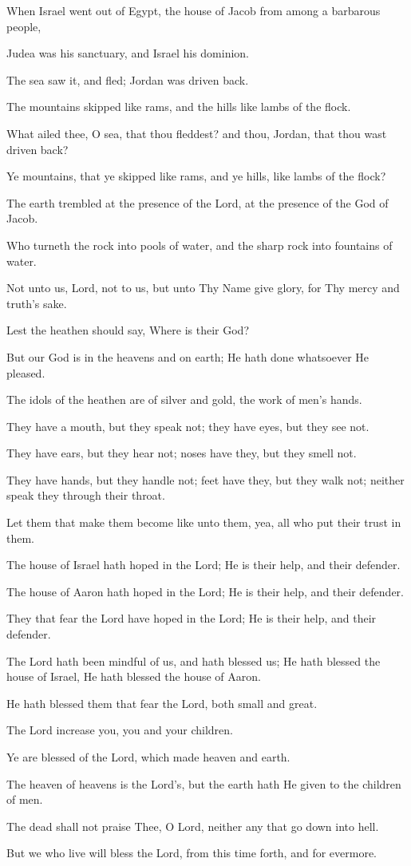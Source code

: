 When Israel went out of Egypt, the house of Jacob from among a barbarous people,

Judea was his sanctuary, and Israel his dominion.

The sea saw it, and fled; Jordan was driven back.

The mountains skipped like rams, and the hills like lambs of the flock.

What ailed thee, O sea, that thou fleddest? and thou, Jordan, that thou wast driven back?

Ye mountains, that ye skipped like rams, and ye hills, like lambs of the flock?

The earth trembled at the presence of the Lord, at the presence of the God of Jacob.

Who turneth the rock into pools of water, and the sharp rock into fountains of water.

Not unto us, Lord, not to us, but unto Thy Name give glory, for Thy mercy and truth’s sake.

Lest the heathen should say, Where is their God?

But our God is in the heavens and on earth; He hath done whatsoever He pleased.

The idols of the heathen are of silver and gold, the work of men’s hands.

They have a mouth, but they speak not; they have eyes, but they see not.

They have ears, but they hear not; noses have they, but they smell not.

They have hands, but they handle not; feet have they, but they walk not; neither speak they through their throat.

Let them that make them become like unto them, yea, all who put their trust in them.

The house of Israel hath hoped in the Lord; He is their help, and their defender.

The house of Aaron hath hoped in the Lord; He is their help, and their defender.

They that fear the Lord have hoped in the Lord; He is their help, and their defender.

The Lord hath been mindful of us, and hath blessed us; He hath blessed the house of Israel, He hath blessed the house of Aaron.

He hath blessed them that fear the Lord, both small and great.

The Lord increase you, you and your children.

Ye are blessed of the Lord, which made heaven and earth.

The heaven of heavens is the Lord's, but the earth hath He given to the children of men.

The dead shall not praise Thee, O Lord, neither any that go down into hell.

But we who live will bless the Lord, from this time forth, and for evermore.
